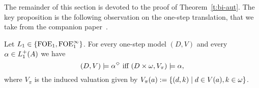 The remainder of this section is devoted to the proof of Theorem~\ref{t:bi-aut}.
The key proposition is the following observation on the one-step translation,
that we take from the companion paper~\cite{carr:mode18}.

\begin{proposition}
\label{p-1P}
Let $L_{1}\in \{{\mathrm{FOE}_1},{\mathrm{FOE}^{\infty}_1}\}$.
For every one-step model $(D,V)$ and every $\alpha \in L_{1}^+(A)$ we have
\begin{equation}
\label{eq-1cr}
(D,V) \models \alpha^{\tmod} \text{ iff } (D\times \om,V_\pi) \models \alpha,
\end{equation}
where $V_{\pi}$ %
 is the induced valuation given by 
$V_{\pi}(a) \mathrel{: =} \{ (d,k) \mid d \in V(a), k\in\omega\}$.
\end{proposition}

% 
% 		

